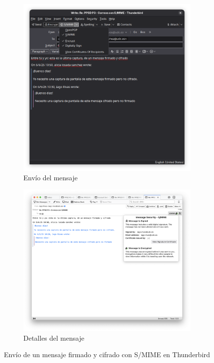 \begin{figure}[H]
    \centering
    \begin{subfigure}{.5\textwidth}
        \centering
        \includegraphics[width=\linewidth]{thunderbird-smime-firmado-cifrado.png}
        \caption{Envío del mensaje}
    \end{subfigure}%
    \begin{subfigure}{.5\textwidth}
        \centering
        \includegraphics[width=\linewidth]{thunderbird-smime-detalles-firmado-cifrado.png}
        \caption{Detalles del mensaje}
    \end{subfigure}
    \caption{Envío de un mensaje firmado y cifrado con S/MIME en Thunderbird}
\end{figure}
